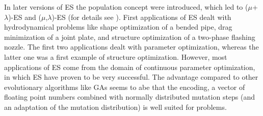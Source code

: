 
In later versions of ES the population concept were introduced, which
led to ($\mu$+$\lambda$)-ES and ($\mu$,$\lambda$)-ES (for details see
). First applications
of ES dealt with hydrodynamical problems like shape optimization of a
bended pipe, drag minimization of a joint plate, and structure
optimization of a two-phase flashing nozzle. The first two
applications dealt with parameter optimization, whereas the latter one
was a first example of structure optimization.  However, most
applications of ES come from the domain of continuous parameter
optimization, in which ES have proven to be very successful.  The
advantage compared to other evolutionary algorithms like GAs seems to
abe that the encoding, a vector of floating point numbers combined
with normally distributed mutation steps (and an adaptation of the
mutation distribution) is well suited for  problems.
